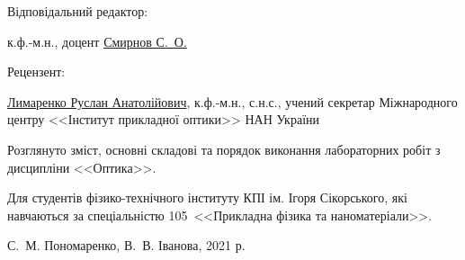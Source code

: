 {\begin{alwayssingle}
        \vspace*{2em}
		\noindent%
        \begin{minipage}[t]{0.2\linewidth}
            	\begin{flushleft}
                    Відповідальний редактор:
                \end{flushleft}
        \end{minipage}\hfill
        \begin{minipage}[t]{0.78\linewidth}
                к.ф.-м.н., доцент \href{http://ipt.kpi.ua/smirnov}{Смирнов С.~О.}
        \end{minipage}

        \vspace*{2em}
		\noindent%
        \begin{minipage}[t]{0.2\linewidth}
            	\begin{flushleft}
                    Рецензент:
                \end{flushleft}
        \end{minipage}\hfill
        \begin{minipage}[t]{0.78\linewidth}
                \href{http://www.nas.gov.ua/UA/PersonalSite/Pages/default.aspx?PersonID=0000007584}{Лимаренко Руслан Анатолійович}, к.ф.-м.н., с.н.с., учений секретар Міжнародного центру <<Інститут прикладної оптики>>  НАН України
        \end{minipage}

        \vfill

		Розглянуто зміст, основні складові та порядок виконання лабораторних робіт з дисципліни <<Оптика>>. 

		Для студентів фізико-технічного інституту КПІ ім. Ігоря Сікорського, які навчаються за спеціальністю 105~<<Прикладна фізика та наноматеріали>>.
		
		\vfill
				
	\begin{flushright}
        \textcopyright{} С.~М. Пономаренко, В.~В. Іванова, 2021 р.
    \end{flushright}
		\newpage%
	\end{alwayssingle}
}



